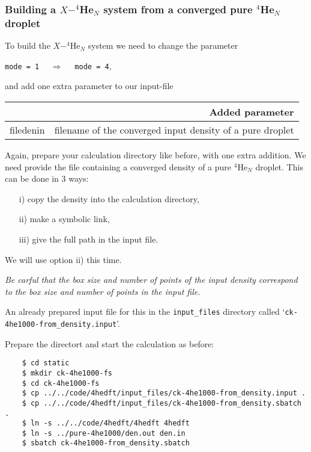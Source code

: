 \documentclass[10pt,a4paper]{article}
\begin{document}
	\subsubsection{Building a $X-^4$He$_{N}$ system from a converged pure $^4$He$_{N}$ droplet}
	To build the $X-^4$He$_N$ system we need to change the parameter
	\begin{center}
	\verb|mode = 1|	$\quad\Longrightarrow\quad$	\verb|mode = 4|,
	\end{center}
	and add one extra parameter to our input-file
	\begin{center}
	\begin{tabular}{l|p{9.75cm}}
		\multicolumn{2}{r}{\textbf{Added parameter}} \\
		\hline\hline
		filedenin 			& filename of the converged input density of a pure droplet \\
	\end{tabular}
	\end{center}
	\vspace{0.1cm}
	Again, prepare your calculation directory like before, with one extra addition. We need provide the file containing a converged density of a pure $^4$He$_N$ droplet. This can be done in 3 ways:
	\begin{itemize}
		\item[i)] copy the density into the calculation directory,
		\item[ii)] make a symbolic link,
		\item[iii)] give the full path in the input file.
	\end{itemize}
	We will use option ii) this time.
	
	{\color{red}\emph{Be carful that the box size and number of points of the input density correspond to the box size and number of points in the input file.}}
	
	An already prepared input file for this in the \verb|input_files| directory called `\verb|ck-4he1000-from_density.input|'.
	
	Prepare the directort and start the calculation as before:
	\begin{verbatim}
	$ cd static
	$ mkdir ck-4he1000-fs
	$ cd ck-4he1000-fs
	$ cp ../../code/4hedft/input_files/ck-4he1000-from_density.input .
	$ cp ../../code/4hedft/input_files/ck-4he1000-from_density.sbatch .
	$ ln -s ../../code/4hedft/4hedft 4hedft
	$ ln -s ../pure-4he1000/den.out den.in
	$ sbatch ck-4he1000-from_density.sbatch
	\end{verbatim}	
\end{document}
